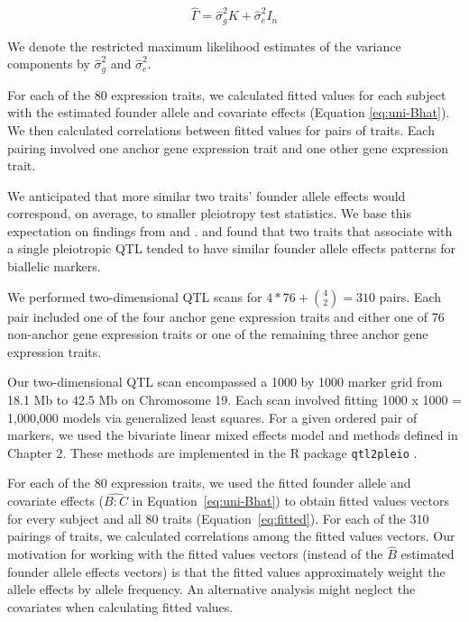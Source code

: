 \documentclass[oneside]{book}
\begin{document}
\begin{equation}\label{eq:Sigma}
\hat \Gamma = \hat\sigma_g^2 K + \hat \sigma_e^2 I_n
\end{equation}

\noindent We denote the restricted maximum likelihood estimates of the variance components by $\hat \sigma_g^2$ and $\hat \sigma_e^2$.


For each of the 80 expression traits, we calculated fitted values for each subject with the estimated founder allele and covariate effects (Equation \ref{eq:uni-Bhat}). 
We then calculated correlations between fitted values for pairs of traits. 
Each pairing involved one anchor gene expression trait and one other gene expression trait.

We anticipated that more similar two traits' founder allele effects would correspond, on average, to smaller pleiotropy test statistics. 
We base this expectation on findings from \citet{macdonald2007joint} and \citet{king2012genetic}. 
\citet{macdonald2007joint} and \citet{king2012genetic} found that two traits that associate with a single pleiotropic QTL tended to have similar founder allele effects patterns for biallelic markers.

We performed two-dimensional QTL scans for $4 * 76 + \binom{4}{2} = 310$ pairs. 
Each pair included one of the four anchor gene expression traits and either one of 76 non-anchor gene expression traits or one of the remaining three anchor gene expression traits.

Our two-dimensional QTL scan encompassed a 1000 by 1000 marker grid from 18.1 Mb to 42.5 Mb on Chromosome 19. Each scan involved fitting 1000 x 1000 = 1,000,000 models via generalized least squares. 
For a given ordered pair of markers, we used the bivariate linear mixed effects model and methods defined in Chapter 2. 
These methods are implemented in the R package \texttt{qtl2pleio} \citep{qtl2pleio}.

For each of the 80 expression traits, we used the fitted founder allele and covariate effects ($\widehat{B:C}$ in Equation~\ref{eq:uni-Bhat}) to 
obtain fitted values vectors for every subject and all 80 traits (Equation~\ref{eq:fitted}). 
For each of the 310 pairings of traits, we calculated correlations among the fitted values vectors. 
Our motivation for working with the fitted values vectors (instead of the $\hat B$ estimated founder allele effects vectors) is that the fitted values approximately weight the allele effects by allele frequency. 
An alternative analysis might neglect the covariates when calculating fitted values.
\end{document}
